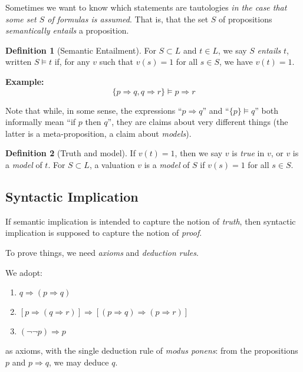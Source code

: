 \documentclass{article}
\theoremstyle{definition}
\newtheorem{definition}{Definition}
\numberwithin{definition}{section}
\newcommand{\entails}{\models}
\begin{document}
  Sometimes we want to know which statements are tautologies \textit{in the case 
that some set $S$ of formulas is assumed}. That is, that the set $S$ of 
propositions \textit{semantically entails} a proposition.

\begin{definition}[Semantic Entailment]
    For $S \subset L$ and $t \in L$, we say $S$ \textit{entails} $t$, written 
  $S \entails t$ if, for any $v$ such that $v(s)=1$ for all $s \in S$, we have 
  $v(t)=1$. 
\end{definition}

\textbf{Example:} 
$$\{p \Rightarrow q, q \Rightarrow r\} \entails p \Rightarrow r$$

Note that while, in some sense, the expressions ``$p \Rightarrow q$'' and 
``$\{p\} \entails q$'' both informally mean ``if $p$ then $q$'', they are 
claims about very different things (the latter is a meta-proposition, a 
claim about \textit{models}).  

\begin{definition}[Truth and model]
If $v(t)=1$, then we say $v$ is \textit{true} in $v$, or 
  $v$ is a \textit{model} of $t$. For $S \subset L$, 
  a valuation $v$ is a \textit{model} of $S$ if $v(s)=1$ for all $s \in S$.
\end{definition}

\subsection{Syntactic Implication}

If semantic implication is intended to capture the notion of \textit{truth}, 
then syntactic implication is supposed to capture the notion of \textit{proof}.

To prove things, we need \textit{axioms} and \textit{deduction rules}. 

We adopt:
\begin{enumerate} %
\item $q \Rightarrow (p \Rightarrow q)$
\item $[p \Rightarrow (q \Rightarrow r)] \Rightarrow [(p \Rightarrow q) \Rightarrow (p \Rightarrow r)] $
\item $(\neg \neg p) \Rightarrow p$
\end{enumerate}
% 
as axioms, with the single deduction rule of \textit{modus ponens}: 
from the propositions $p$ and $p \Rightarrow q$, we may deduce $q$. 
\end{document}
